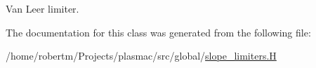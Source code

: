 Van Leer limiter. 



The documentation for this class was generated from the following file\+:\begin{DoxyCompactItemize}
\item 
/home/robertm/\+Projects/plasmac/src/global/\hyperlink{slope__limiters_8H}{slope\+\_\+limiters.\+H}\end{DoxyCompactItemize}
